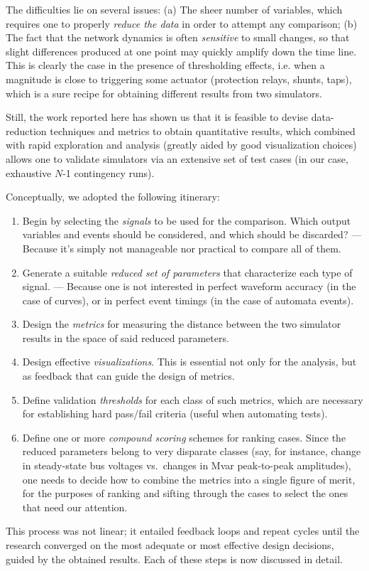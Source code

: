 \documentclass[conference]{IEEEtran}
\begin{document}
The difficulties lie on several issues: (a) The sheer number of variables, which
requires one to properly \emph{reduce the data} in order to attempt any
comparison; (b) The fact that the network dynamics is often \emph{sensitive} to
small changes, so that slight differences produced at one point may quickly
amplify down the time line. This is clearly the case in the presence of
thresholding effects, i.e. when a magnitude is close to triggering some actuator
(protection relays, shunts, taps), which is a sure recipe for obtaining
different results from two simulators.

Still, the work reported here has shown us that it is feasible to devise
data-reduction techniques and metrics to obtain quantitative results, which
combined with rapid exploration and analysis (greatly aided by good
visualization choices) allows one to validate simulators via an extensive set of
test cases (in our case, exhaustive $N$-1 contingency runs).

Conceptually, we adopted the following itinerary:
\begin{enumerate}
  \item Begin by selecting the \emph{signals} to be
        used for the comparison. Which output variables and events should
        be considered, and which should be discarded? --- Because it's simply
        not manageable nor practical to compare all of them.
  \item Generate a suitable \emph{reduced set of parameters} that characterize
        each type of signal. --- Because one is not interested in perfect waveform
        accuracy (in the case of curves), or in perfect event timings (in the case
        of automata events).
  \item Design the \emph{metrics} for measuring the distance between the two
        simulator results in the space of said reduced parameters.
  \item Design effective \emph{visualizations}. This is essential not only
        for the analysis, but as feedback that can guide the design of
        metrics.
  \item Define validation \emph{thresholds} for each class of such
        metrics, which are necessary for establishing hard pass/fail
        criteria (useful when automating tests).
  \item Define one or more \emph{compound scoring} schemes for ranking
        cases. Since the reduced parameters belong to very disparate classes (say,
        for instance, change in steady-state bus voltages vs.\ changes in Mvar
        peak-to-peak amplitudes), one needs to decide how to combine the metrics
        into a single figure of merit, for the purposes of ranking and sifting
        through the cases to select the ones that need our attention.
\end{enumerate}
This process was not linear; it entailed feedback loops and repeat cycles until
the research converged on the most adequate or most effective design decisions,
guided by the obtained results.  Each of these steps is now discussed in detail.
\end{document}
